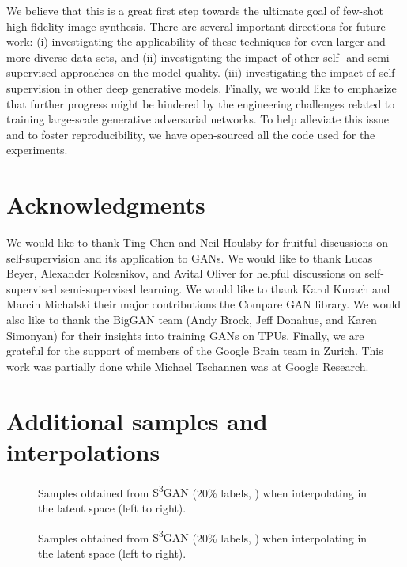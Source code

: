 \documentclass{article}
\newcommand{\tranSSS}{\textsc{S\textsuperscript{3}GAN}}
\begin{document}
We believe that this is a great first step towards the ultimate goal of few-shot high-fidelity image synthesis. There are several important directions for future work: (i) investigating the applicability of these techniques for even larger and more diverse data sets, and (ii) investigating the impact of other self- and semi-supervised approaches on the model quality. (iii) investigating the impact of self-supervision in other deep generative models. Finally, we would like to emphasize that further progress might be hindered by the engineering challenges related to training large-scale generative adversarial networks. To help alleviate this issue and to foster reproducibility, we have open-sourced all the code used for the experiments.

\section*{Acknowledgments}
We would like to thank Ting Chen and Neil Houlsby for fruitful discussions on self-supervision and its application to GANs. We would like to thank Lucas Beyer, Alexander Kolesnikov, and Avital Oliver for helpful discussions on self-supervised semi-supervised learning. We would like to thank Karol Kurach and Marcin Michalski their major contributions the Compare GAN library. We would also like to thank the BigGAN team (Andy Brock, Jeff Donahue, and Karen Simonyan) for their insights into training GANs on TPUs. Finally, we are grateful for the support of members of the Google Brain team in Zurich. This work was partially done while Michael Tschannen was at Google Research.



\appendix
\onecolumn

\section{Additional samples and interpolations}\label{sec:samples}

\begin{figure}[h]
\centering
{}
\caption{Samples obtained from \tranSSS{} (20\% labels, ) when interpolating in the latent space (left to right).\label{fig:s2-20-5}}
\end{figure}
\vspace{3cm}
\begin{figure}[h]
\centering
{}
\caption{Samples obtained from \tranSSS{} (20\% labels, ) when interpolating in the latent space (left to right).\label{fig:s2-20-3}}
\end{figure}
\end{document}
